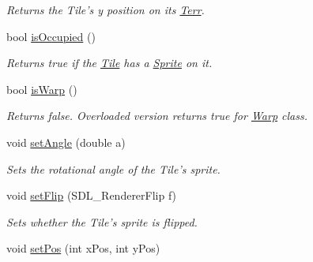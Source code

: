 \begin{DoxyCompactItemize}
\begin{DoxyCompactList}\small\item\em Returns the Tile’s y position on its \hyperlink{class_terr}{Terr}. \end{DoxyCompactList}\item 
bool \hyperlink{class_tile_ac556e7bbe293dde62d66b46e3d12bcb7}{is\+Occupied} ()\hypertarget{class_tile_ac556e7bbe293dde62d66b46e3d12bcb7}{}\label{class_tile_ac556e7bbe293dde62d66b46e3d12bcb7}

\begin{DoxyCompactList}\small\item\em Returns true if the \hyperlink{class_tile}{Tile} has a \hyperlink{class_sprite}{Sprite} on it. \end{DoxyCompactList}\item 
bool \hyperlink{class_tile_a5ef077b74542da250b812bc708920e8a}{is\+Warp} ()\hypertarget{class_tile_a5ef077b74542da250b812bc708920e8a}{}\label{class_tile_a5ef077b74542da250b812bc708920e8a}

\begin{DoxyCompactList}\small\item\em Returns false. Overloaded version returns true for \hyperlink{class_warp}{Warp} class. \end{DoxyCompactList}\item 
void \hyperlink{class_tile_a94f9e2d35e55c1d1b9f56dbd7816f51a}{set\+Angle} (double a)\hypertarget{class_tile_a94f9e2d35e55c1d1b9f56dbd7816f51a}{}\label{class_tile_a94f9e2d35e55c1d1b9f56dbd7816f51a}

\begin{DoxyCompactList}\small\item\em Sets the rotational angle of the Tile’s sprite. \end{DoxyCompactList}\item 
void \hyperlink{class_tile_a801a349b0e7f7500b60af91e5e821f2e}{set\+Flip} (S\+D\+L\+\_\+\+Renderer\+Flip f)\hypertarget{class_tile_a801a349b0e7f7500b60af91e5e821f2e}{}\label{class_tile_a801a349b0e7f7500b60af91e5e821f2e}

\begin{DoxyCompactList}\small\item\em Sets whether the Tile’s sprite is flipped. \end{DoxyCompactList}\item 
void \hyperlink{class_tile_a8a6429d2adbe3e45c519d86a57b514c3}{set\+Pos} (int x\+Pos, int y\+Pos)\hypertarget{class_tile_a8a6429d2adbe3e45c519d86a57b514c3}{}\label{class_tile_a8a6429d2adbe3e45c519d86a57b514c3}


\end{DoxyCompactItemize}
